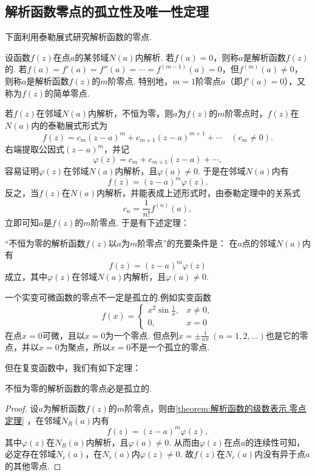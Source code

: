 \subsection{解析函数零点的孤立性及唯一性定理}
下面利用泰勒展式研究解析函数的零点.
\begin{definition}\label{definition:解析函数的级数表示.零点}
设函数\(f(z)\)在点\(a\)的某邻域\(N(a)\)内解析.
若\(f(a)=0\)，则称\(a\)是解析函数\(f(z)\)的.
若\(f(a)=f'(a)=f''(a)=\dotsb=f^{(m-1)}(a)=0\)，但\(f^{(m)}(a)\neq0\)，则称\(a\)是解析函数\(f(z)\)的\(m\)阶零点.
特别地，\(m=1\)阶零点\(a\)（即\(f'(a)=0\)），又称为\(f(z)\)的简单零点.
\end{definition}

若\(f(z)\)在邻域\(N(a)\)内解析，不恒为零，则\(a\)为\(f(z)\)的\(m\)阶零点时，\(f(z)\)在\(N(a)\)内的泰勒展式形式为\[
f(z) = c_m (z-a)^m + c_{m+1} (z-a)^{m+1} + \dotsb \quad(c_m\neq0).
\]右端提取公因式\((z-a)^m\)，并记\[
\varphi(z) = c_m + c_{m+1} (z-a) + \dotsb,
\]容易证明\(\varphi(z)\)在邻域\(N(a)\)内解析，且\(\varphi(a)\neq0\).
于是在邻域\(N(a)\)内有\[
f(z) = (z-a)^m \varphi(z).
\]反之，当\(f(z)\)在\(N(a)\)内解析，并能表成上述形式时，由泰勒定理中的关系式\[
c_n = \frac{1}{n!} f^{(n)}(a),
\]立即可知\(a\)是\(f(z)\)的\(m\)阶零点.
于是有下述定理：
\begin{theorem}\label{theorem:解析函数的级数表示.零点定理}
“不恒为零的解析函数\(f(z)\)以\(a\)为\(m\)阶零点”的充要条件是：
在\(a\)点的邻域\(N(a)\)内有\[
f(z) = (z-a)^m \varphi(z)
\]成立，其中\(\varphi(z)\)在邻域\(N(a)\)内解析，且\(\varphi(a)\neq0\).
\end{theorem}

一个实变可微函数的零点不一定是孤立的.例如实变函数\[
f(x) = \left\{ \begin{array}{cl}
x^2 \sin\frac{1}{x}, & x\neq0, \\
0, & x=0
\end{array} \right.
\]在点\(x=0\)可微，且以\(x=0\)为一个零点.
但点列\(x = \pm\frac{1}{n\pi}\ (n=1,2,\dotsc)\)也是它的零点，并以\(x = 0\)为聚点，所以\(x = 0\)不是一个孤立的零点.

但在复变函数中，我们有如下定理：
\begin{theorem}\label{theorem:解析函数的级数表示.解析函数的零点的孤立性}
不恒为零的解析函数的零点必是孤立的.
\begin{proof}
设\(a\)为解析函数\(f(z)\)的\(m\)阶零点，则由\cref{theorem:解析函数的级数表示.零点定理} ，在邻域\(N_R(a)\)内有\[
f(z) = (z-a)^m \varphi(z),
\]其中\(\varphi(z)\)在\(N_R(a)\)内解析，且\(\varphi(a)\neq0\).
从而由\(\varphi(z)\)在点\(a\)的连续性可知，必定存在邻域\(N_r(a)\)，在\(N_r(a)\)内\(\varphi(z)\neq0\).
故\(f(z)\)在\(N_r(a)\)内没有异于点\(a\)的其他零点.
\end{proof}
\end{theorem}

